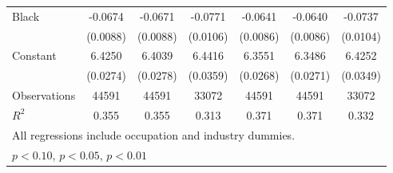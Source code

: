 {\begin{longtable}{l*{6}{c}}
Black               &     -0.0674\sym{***}&     -0.0671\sym{***}&     -0.0771\sym{***}&     -0.0641\sym{***}&     -0.0640\sym{***}&     -0.0737\sym{***}\\
                    &    (0.0088)         &    (0.0088)         &    (0.0106)         &    (0.0086)         &    (0.0086)         &    (0.0104)         \\
Constant            &      6.4250\sym{***}&      6.4039\sym{***}&      6.4416\sym{***}&      6.3551\sym{***}&      6.3486\sym{***}&      6.4252\sym{***}\\
                    &    (0.0274)         &    (0.0278)         &    (0.0359)         &    (0.0268)         &    (0.0271)         &    (0.0349)         \\
\hline  
Observations        &       44591         &       44591         &       33072         &       44591         &       44591         &       33072         \\
\(R^{2}\)           &       0.355         &       0.355         &       0.313         &       0.371         &       0.371         &       0.332         \\
\hline  
\multicolumn{7}{l}{\footnotesize All regressions include occupation and industry dummies.}\\
\multicolumn{7}{l}{\footnotesize \sym{*} \(p<0.10\), \sym{**} \(p<0.05\), \sym{***} \(p<0.01\)}\\
\end{longtable}
}
